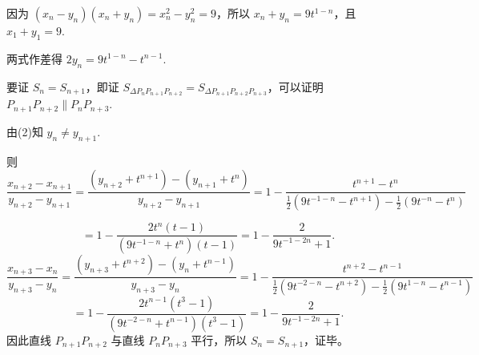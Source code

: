 \begin{solutions}
因为 $(x_n-y_n)(x_n+y_n)=x_n^2-y_n^2=9$，所以 $x_n+y_n=9t^{1-n}$，且 $x_1+y_1=9$.

两式作差得 $2y_n=9t^{1-n}-t^{n-1}$.

要证 $S_n=S_{n+1}$，即证 $S_{\Delta P_n P_{n+1} P_{n+2}} = S_{\Delta P_{n+1} P_{n+2} P_{n+3}}$，可以证明 $P_{n+1}P_{n+2} \parallel P_n P_{n+3}$.

由(2)知 $y_n \neq y_{n+1}$.

则 $\dfrac{x_{n+2}-x_{n+1}}{y_{n+2}-y_{n+1}} = \dfrac{(y_{n+2}+t^{n+1})-(y_{n+1}+t^n)}{y_{n+2}-y_{n+1}} = 1 - \dfrac{t^{n+1}-t^n}{\frac{1}{2}(9t^{-1-n}-t^{n+1}) - \frac{1}{2}(9t^{-n}-t^n)}$

\[
= 1 - \frac{2t^n(t-1)}{(9t^{-1-n}+t^n)(t-1)} = 1 - \frac{2}{9t^{-1-2n}+1}.
\]
\[
\frac{x_{n+3}-x_n}{y_{n+3}-y_n} = \frac{(y_{n+3}+t^{n+2})-(y_n+t^{n-1})}{y_{n+3}-y_n} = 1 - \frac{t^{n+2}-t^{n-1}}{\frac{1}{2}(9t^{-2-n}-t^{n+2}) - \frac{1}{2}(9t^{1-n}-t^{n-1})}
\]
\[
= 1 - \frac{2t^{n-1}(t^3-1)}{(9t^{-2-n}+t^{n-1})(t^3-1)} = 1 - \frac{2}{9t^{-1-2n}+1}.
\]
因此直线 $P_{n+1}P_{n+2}$ 与直线 $P_n P_{n+3}$ 平行，所以 $S_n=S_{n+1}$，证毕。
\end{solutions}
